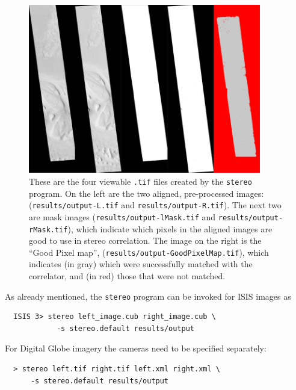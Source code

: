 \begin{figure}[t!]
\begin{minipage}{4in}
\includegraphics[width=4in]{images/p19-stereo-output_400px.png}
\end{minipage}
\hfill
\begin{minipage}{2.9in}
\caption[P19 stereo output images]{
    \label{p19-stereo-output}
        These are the four viewable \texttt{.tif} files created by the
        \texttt{stereo} program.  On the left are the two aligned,
        pre-processed images: (\texttt{results/output-L.tif} and
        \texttt{results/output-R.tif}).  The next two are mask images
        (\texttt{results/output-lMask.tif} and
        \texttt{results/output-rMask.tif}), which indicate which
        pixels in the aligned images are good to use in stereo
        correlation.  The image on the right is the ``Good Pixel
        map'', (\texttt{results/output-GoodPixelMap.tif}), which
        indicates (in gray) which were successfully matched with the
        correlator, and (in red) those that were not matched.}
\end{minipage}
\end{figure}

As already mentioned, the \texttt{stereo} program can be invoked for ISIS
images as

\begin{verbatim}
  ISIS 3> stereo left_image.cub right_image.cub \
            -s stereo.default results/output
\end{verbatim}

For Digital Globe imagery the cameras need to be specified separately:

\begin{verbatim}
  > stereo left.tif right.tif left.xml right.xml \
      -s stereo.default results/output
\end{verbatim}

